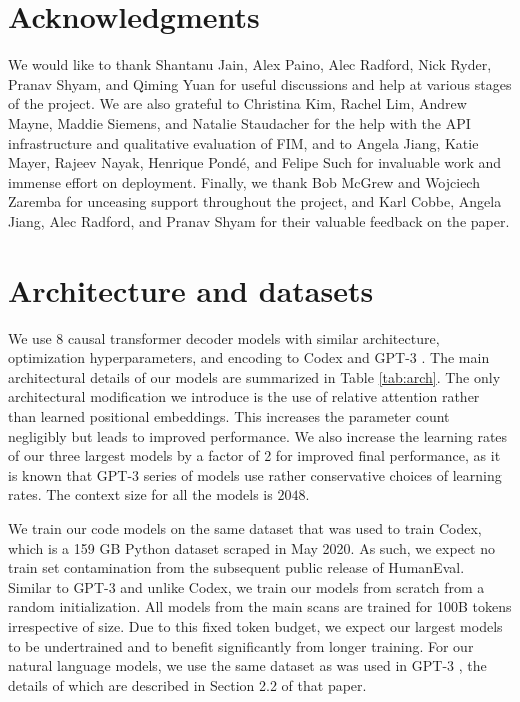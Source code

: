 \documentclass[postscript]{article}
\begin{document}
\section*{Acknowledgments}

We would like to thank Shantanu Jain, Alex Paino, Alec Radford, Nick Ryder, Pranav Shyam, and Qiming Yuan for useful discussions and help at various stages of the project. We are also grateful to Christina Kim, Rachel Lim, Andrew Mayne, Maddie Siemens, and Natalie Staudacher for the help with the API infrastructure and qualitative evaluation of FIM, and to Angela Jiang, Katie Mayer, Rajeev Nayak, Henrique Pond\'e, and Felipe Such for invaluable work and immense effort on deployment. Finally, we thank Bob McGrew and Wojciech Zaremba for unceasing support throughout the project, and Karl Cobbe, Angela Jiang, Alec Radford, and Pranav Shyam for their valuable feedback on the paper.




\appendix

\clearpage

\section{Architecture and datasets}\label{appendix:arch}
\label{sec:setup:model}
We use 8 causal transformer decoder models \citep{transformer} with similar architecture, optimization hyperparameters, and encoding to Codex and GPT-3 \citep{codex, gpt3}. The main architectural details of our models are summarized in Table \ref{tab:arch}. The only architectural modification we introduce is the use of relative attention \citep{relattn,xl} rather than learned positional embeddings. This increases the parameter count negligibly but leads to improved performance. We also increase the learning rates of our three largest models by a factor of 2 for improved final performance, as it is known that GPT-3 series of models use rather conservative choices of learning rates. The context size for all the models is $2048$.

We train our code models on the same dataset that was used to train Codex, which is a 159 GB Python dataset scraped in May 2020. As such, we expect no train set contamination from the subsequent public release of HumanEval. Similar to GPT-3 and unlike Codex, we train our models from scratch from a random initialization. All models from the main scans are trained for 100B tokens irrespective of size. Due to this fixed token budget, we expect our largest models to be undertrained \citep {chinchi} and to benefit significantly from longer training. For our natural language models, we use the same dataset as was used in GPT-3 \citep{gpt3}, the details of which are described in Section 2.2 of that paper.
\end{document}
